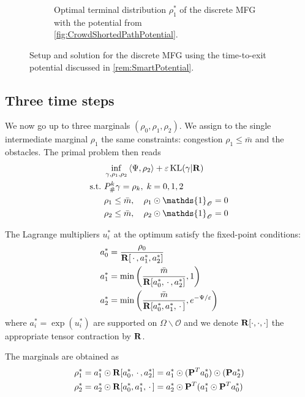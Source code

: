 \documentclass[../report.tex]{subfiles}
\begin{document}
\begin{figure}
\begin{subfigure}[t]{.4\linewidth}
		\caption{Optimal terminal distribution $\rho^*_1$ of the discrete MFG with the potential from \cref{fig:CrowdShortedPathPotential}.}\label{fig:2MargEikonalGame}
	\end{subfigure}
	\caption{Setup and solution for the discrete MFG using the time-to-exit potential discussed in \cref{rem:SmartPotential}.}
\end{figure}


\subsection{Three time steps}

We now go up to three marginals $(\rho_0,\rho_1,\rho_2)$. We assign to the single intermediate marginal $\rho_1$ the same constraints: congestion $\rho_1 \leq \bar{m}$ and the obstacles. The primal problem then reads
\begin{equation}
\begin{aligned}
	&\inf_{\gamma,\rho_1,\rho_2}{} \langle \Psi, \rho_2\rangle + \epsilon \KL(\gamma | \bfR) \\
	\suchthat \ & P^k_\#\gamma = \rho_k,\; k = 0,1,2 \\
	& \rho_1 \leq \bar{m}, \quad \rho_1\odot\mathds{1}_{\mathscr O} = 0\\
	& \rho_2 \leq \bar{m}, \quad \rho_2\odot\mathds{1}_{\mathscr O} = 0
\end{aligned}
\end{equation}

\begin{prop}
The Lagrange multipliers $u_i^*$ at the optimum satisfy the fixed-point conditions:
\begin{align*}
	&a_0^* = \frac{\rho_0}{\mathbf{R}[\,\cdot\,, a_1^*, a_2^*]} \\
	&a_1^* = \min\left(
	\frac{\bar{m}}{\mathbf{R}[a_0^*, \,\cdot\,, a_2^*]}, 1\right) \\
	&a_2^* = \min\left(
	\frac{\bar{m}}{\mathbf{R}[a_0^*, a_1^*, \,\cdot\,]}, e^{-\Psi/\varepsilon}
	\right)
\end{align*}
where $a_i^* = \exp(u_i^*)$ are supported on $\Omega\backslash\mathscr{O}$ and we denote $\mathbf{R}[\cdot,\cdot,\cdot]$ the appropriate tensor contraction by $\mathbf{R}$.

The marginals are obtained as
\[
\begin{aligned}
	\rho_1^* &=
	a_1^* \odot
	\mathbf{R}[a_0^*, \,\cdot\,, a_2^*] =
	a_1^* \odot
	(\mathbf{P}^Ta_0^*) \odot
	(\mathbf{P}a_2^*) \\
	\rho_2^* &= 
	a_2^* \odot \mathbf{R}[a_0^*, a_1^*, \,\cdot\,]
	= a_2^* \odot
	\mathbf{P}^T
	(a_1^* \odot \mathbf{P}^Ta_0^*)
\end{aligned}
\]
\end{prop}
\end{document}
